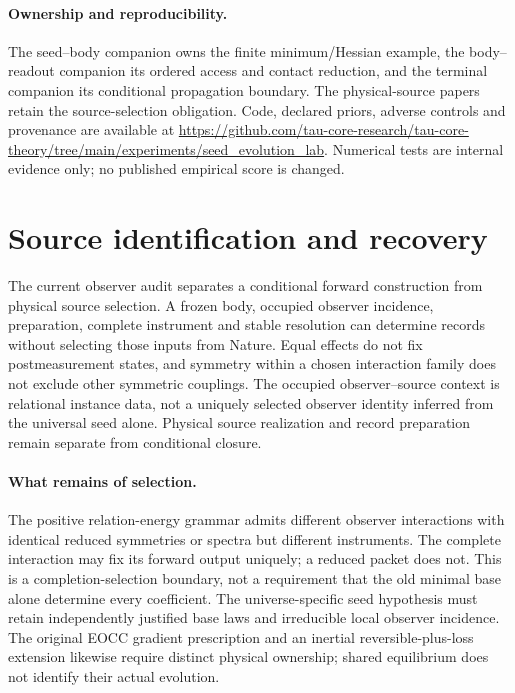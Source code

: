 \documentclass[11pt,a4paper]{article}
\theoremstyle{remark}
\begin{document}
\paragraph{Ownership and reproducibility.}
The seed--body companion owns the finite minimum/Hessian example, the body--readout companion its ordered access and contact reduction, and the terminal companion its conditional propagation boundary. The physical-source papers retain the source-selection obligation. Code, declared priors, adverse controls and provenance are available at \url{https://github.com/tau-core-research/tau-core-theory/tree/main/experiments/seed_evolution_lab}. Numerical tests are internal evidence only; no published empirical score is changed.

\section{Source identification and recovery}
The current observer audit separates a conditional forward construction from physical source selection. A frozen body, occupied observer incidence, preparation, complete instrument and stable resolution can determine records without selecting those inputs from Nature. Equal effects do not fix postmeasurement states, and symmetry within a chosen interaction family does not exclude other symmetric couplings. The occupied observer--source context is relational instance data, not a uniquely selected observer identity inferred from the universal seed alone. Physical source realization and record preparation remain separate from conditional closure.

\paragraph{What remains of selection.}
The positive relation-energy grammar admits different observer interactions with identical reduced symmetries or spectra but different instruments. The complete interaction may fix its forward output uniquely; a reduced packet does not. This is a completion-selection boundary, not a requirement that the old minimal base alone determine every coefficient. The universe-specific seed hypothesis must retain independently justified base laws and irreducible local observer incidence. The original EOCC gradient prescription and an inertial reversible-plus-loss extension likewise require distinct physical ownership; shared equilibrium does not identify their actual evolution.
\end{document}
